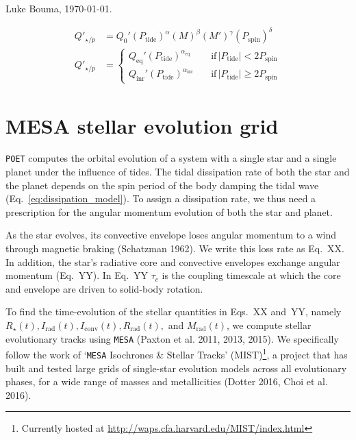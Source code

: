 \documentclass{article}
\begin{document}
\noindent Luke Bouma, \today.

\begin{align}
Q'_{\star/p} &= Q_0' (P_\mathrm{tide})^\alpha (M)^\beta (M')^\gamma 
(P_\mathrm{spin})^\delta
\label{eq:dissipation_model} \\
Q'_{\star/p} &= 
\begin{cases}
Q_\mathrm{eq}' (P_\mathrm{tide})^{\alpha_\mathrm{eq}} \quad 
&\mathrm{if}\,|P_\mathrm{tide}|<2P_\mathrm{spin}\\
Q_\mathrm{inr}' (P_\mathrm{tide})^{\alpha_\mathrm{inr}} \quad 
&\mathrm{if}\,|P_\mathrm{tide}|\geq2 P_\mathrm{spin}
\end{cases}
\end{align}

\section{MESA stellar evolution grid}	

\texttt{POET} computes the orbital evolution of a system with a single star and 
a single planet under the influence of tides.
The tidal dissipation rate of both the star and the planet depends on the
spin period of the body damping the tidal wave 
(Eq.~\protect\ref{eq:dissipation_model}).
To assign a dissipation rate, we thus need a prescription for the angular 
momentum evolution of both the star and planet.

As the star evolves, its convective envelope loses angular momentum to 
a wind through magnetic braking (Schatzman 1962). We write this loss rate as 
Eq.~XX. In addition, the star's radiative core and convective envelopes 
exchange angular momentum (Eq.~YY). In Eq.~YY $\tau_c$ is the coupling timescale 
at which the core and envelope are driven to solid-body rotation. 

To find the time-evolution of the stellar quantities in 
Eqs.~XX and~YY, namely 
$R_\star(t),I_\mathrm{rad}(t),I_\mathrm{conv}(t),R_\mathrm{rad}(t),$ 
and $M_\mathrm{rad}(t)$, we compute stellar evolutionary tracks using 
\texttt{MESA} (Paxton et al. 2011, 2013, 2015).
We specifically follow the work of `\texttt{MESA} Isochrones \& Stellar Tracks' 
(MIST)\footnote{Currently hosted at 
\url{http://waps.cfa.harvard.edu/MIST/index.html}}, a project 
that has built and tested large grids of single-star 
evolution models across all evolutionary phases, for a wide range of masses and 
metallicities (Dotter 2016, Choi et al. 2016).
\end{document}
